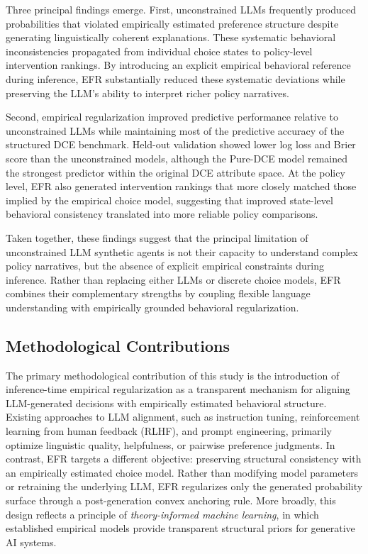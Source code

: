 \documentclass[11pt]{article}
\begin{document}
Three principal findings emerge. First, unconstrained LLMs frequently produced probabilities that violated empirically estimated preference structure despite generating linguistically coherent explanations. These systematic behavioral inconsistencies propagated from individual choice states to policy-level intervention rankings. By introducing an explicit empirical behavioral reference during inference, EFR substantially reduced these systematic deviations while preserving the LLM's ability to interpret richer policy narratives.

Second, empirical regularization improved predictive performance relative to unconstrained LLMs while maintaining most of the predictive accuracy of the structured DCE benchmark. Held-out validation showed lower log loss and Brier score than the unconstrained models, although the Pure-DCE model remained the strongest predictor within the original DCE attribute space. At the policy level, EFR also generated intervention rankings that more closely matched those implied by the empirical choice model, suggesting that improved state-level behavioral consistency translated into more reliable policy comparisons.

Taken together, these findings suggest that the principal limitation of unconstrained LLM synthetic agents is not their capacity to understand complex policy narratives, but the absence of explicit empirical constraints during inference. Rather than replacing either LLMs or discrete choice models, EFR combines their complementary strengths by coupling flexible language understanding with empirically grounded behavioral regularization.

\subsection{Methodological Contributions}

The primary methodological contribution of this study is the introduction of inference-time empirical regularization as a transparent mechanism for aligning LLM-generated decisions with empirically estimated behavioral structure. Existing approaches to LLM alignment, such as instruction tuning, reinforcement learning from human feedback (RLHF), and prompt engineering, primarily optimize linguistic quality, helpfulness, or pairwise preference judgments. In contrast, EFR targets a different objective: preserving structural consistency with an empirically estimated choice model. Rather than modifying model parameters or retraining the underlying LLM, EFR regularizes only the generated probability surface through a post-generation convex anchoring rule. More broadly, this design reflects a principle of \emph{theory-informed machine learning}, in which established empirical models provide transparent structural priors for generative AI systems.
\end{document}
